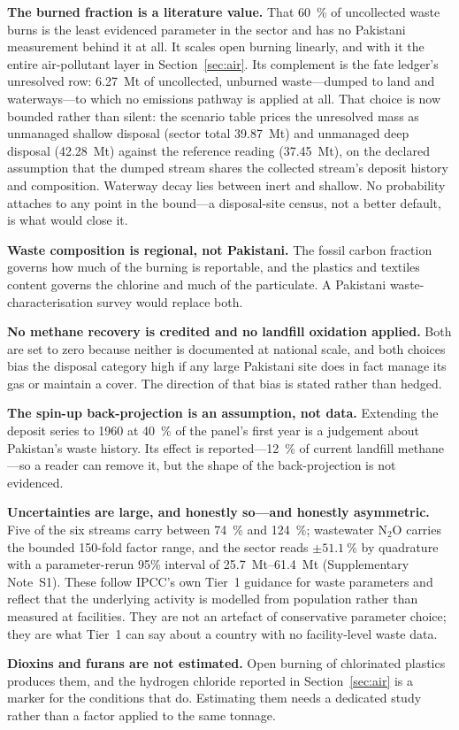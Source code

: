 \textbf{The burned fraction is a literature value.} That \SI{60}{\percent} of uncollected
waste burns is the least evidenced parameter in the sector and has no Pakistani measurement
behind it at all. It scales open burning linearly, and with it the entire air-pollutant layer
in Section~\ref{sec:air}. Its complement is the fate ledger's unresolved row:
\SI{6.27}{\mega\tonne} of uncollected, unburned waste---dumped to land and
waterways---to which no emissions pathway is applied at all. That choice is now bounded
rather than silent: the scenario table prices the unresolved mass as unmanaged shallow
disposal (sector total \SI{39.87}{\mega\tonne}) and unmanaged deep disposal
(\SI{42.28}{\mega\tonne}) against the reference reading (\SI{37.45}{\mega\tonne}),
on the declared assumption that the dumped stream shares the collected stream's deposit
history and composition. Waterway decay lies between inert and shallow. No probability
attaches to any point in the bound---a disposal-site census, not a better default, is
what would close it.

\textbf{Waste composition is regional, not Pakistani.} The fossil carbon fraction governs how
much of the burning \COtwo{} is reportable, and the plastics and textiles content governs the
chlorine and much of the particulate. A Pakistani waste-characterisation survey would replace
both.

\textbf{No methane recovery is credited and no landfill oxidation applied.} Both are set to
zero because neither is documented at national scale, and both choices bias the disposal
category high if any large Pakistani site does in fact manage its gas or maintain a cover. The
direction of that bias is stated rather than hedged.

\textbf{The spin-up back-projection is an assumption, not data.} Extending the deposit series
to 1960 at \SI{40}{\percent} of the panel's first year is a judgement about Pakistan's waste
history. Its effect is reported---\SI{12}{\percent} of current landfill methane---so a reader
can remove it, but the shape of the back-projection is not evidenced.

\textbf{Uncertainties are large, and honestly so---and honestly asymmetric.}
Five of the six streams carry between
\SI{74}{\percent} and \SI{124}{\percent}; wastewater N$_2$O carries the bounded 150-fold
factor range, and the sector reads $\pm\SI{51.1}{\percent}$ by quadrature with a
parameter-rerun 95\% interval of \SIrange{25.7}{61.4}{\mega\tonne}
(Supplementary Note~S1).
These follow IPCC's own Tier~1 guidance for waste parameters and reflect that the underlying
activity is modelled from population rather than measured at facilities. They are not an
artefact of conservative parameter choice; they are what Tier~1 can say about a country with
no facility-level waste data.

\textbf{Dioxins and furans are not estimated.} Open burning of chlorinated plastics produces
them, and the hydrogen chloride reported in Section~\ref{sec:air} is a marker for the
conditions that do. Estimating them needs a dedicated study rather than a factor applied to
the same tonnage.
